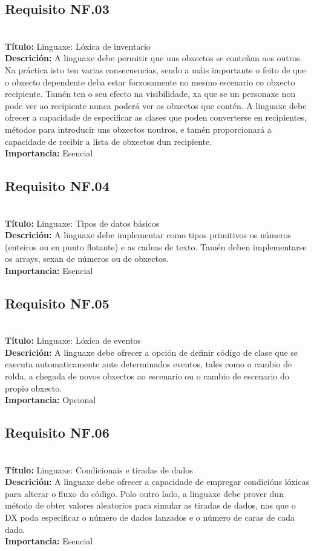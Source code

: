 \subsection{Requisito NF.03}~\\
{\bf Título:} Linguaxe: Lóxica de inventario\\
{\bf Descrición:} A linguaxe debe permitir que uns obxectos se conteñan aos
outros. Na práctica isto ten varias consecuencias, sendo a máis importante o
feito de que o obxecto dependente deba estar forzosamente no mesmo escenario co
obxecto recipiente. Tamén ten o seu efecto na visibilidade, xa que se un
personaxe non pode ver ao recipiente nunca poderá ver os obxectos que contén. A
linguaxe debe ofrecer a capacidade de especificar as clases que poden
converterse en recipientes, métodos para introducir uns obxectos noutros, e
tamén proporcionará a capacidade de recibir a lista de obxectos dun recipiente.\\
{\bf Importancia:} Esencial

\subsection{Requisito NF.04}~\\
{\bf Título:} Linguaxe: Tipos de datos básicos\\
{\bf Descrición:} A linguaxe debe implementar como tipos primitivos os números
(enteiros ou en punto flotante) e as cadeas de texto. Tamén deben implementarse
os arrays, sexan de números ou de obxectos.\\
{\bf Importancia:} Esencial

\subsection{Requisito NF.05}~\\
{\bf Título:} Linguaxe: Lóxica de eventos\\
{\bf Descrición:} A linguaxe debe ofrecer a opción de definir código de clase
que se executa automaticamente ante determinados eventos, tales como o cambio
de rolda, a chegada de novos obxectos ao escenario ou o cambio de escenario do
propio obxecto.\\
{\bf Importancia:} Opcional

\subsection{Requisito NF.06}~\\
{\bf Título:} Linguaxe: Condicionais e tiradas de dados\\
{\bf Descrición:} A linguaxe debe ofrecer a capacidade de empregar condicións
lóxicas para alterar o fluxo do código. Polo outro lado, a linguaxe debe prover
dun método de obter valores aleatorios para simular as tiradas de dados, nas
que o DX poda especificar o número de dados lanzados e o número de caras de
cada dado.\\
{\bf Importancia:} Esencial

